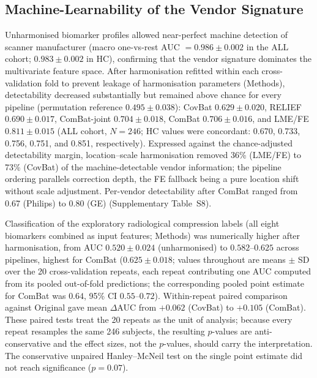 \documentclass[12pt,a4paper]{article}
\begin{document}
\subsection{Machine-Learnability of the Vendor Signature}

Unharmonised biomarker profiles allowed near-perfect machine detection of scanner manufacturer (macro one-vs-rest AUC $=0.986\pm0.002$ in the ALL cohort; $0.983\pm0.002$ in HC), confirming that the vendor signature dominates the multivariate feature space. After harmonisation refitted within each cross-validation fold to prevent leakage of harmonisation parameters (Methods), detectability decreased substantially but remained above chance for every pipeline (permutation reference $0.495\pm0.038$): CovBat $0.629\pm0.020$, RELIEF $0.690\pm0.017$, ComBat-joint $0.704\pm0.018$, ComBat $0.706\pm0.016$, and LME/FE $0.811\pm0.015$ (ALL cohort, $N=246$; HC values were concordant: 0.670, 0.733, 0.756, 0.751, and 0.851, respectively). Expressed against the chance-adjusted detectability margin, location--scale harmonisation removed 36\% (LME/FE) to 73\% (CovBat) of the machine-detectable vendor information; the pipeline ordering parallels correction depth, the FE fallback being a pure location shift without scale adjustment. Per-vendor detectability after ComBat ranged from 0.67 (Philips) to 0.80 (GE) (Supplementary Table~S8).

Classification of the exploratory radiological compression labels (all eight biomarkers combined as input features; Methods) was numerically higher after harmonisation, from AUC $0.520\pm0.024$ (unharmonised) to $0.582$--$0.625$ across pipelines, highest for ComBat ($0.625\pm0.018$; values throughout are means $\pm$ SD over the 20 cross-validation repeats, each repeat contributing one AUC computed from its pooled out-of-fold predictions; the corresponding pooled point estimate for ComBat was $0.64$, 95\% CI $0.55$--$0.72$). Within-repeat paired comparison against Original gave mean $\Delta$AUC from $+0.062$ (CovBat) to $+0.105$ (ComBat). These paired tests treat the 20 repeats as the unit of analysis; because every repeat resamples the same 246 subjects, the resulting $p$-values are anti-conservative and the effect sizes, not the $p$-values, should carry the interpretation. The conservative unpaired Hanley--McNeil test on the single point estimate did not reach significance ($p=0.07$).
\end{document}
